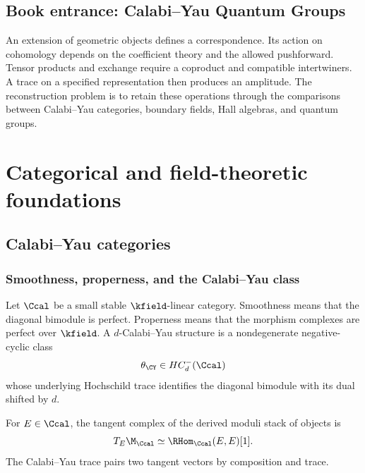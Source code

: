 \cleardoublepage
{}
{}
\chapter*{Book entrance: Calabi--Yau Quantum Groups}
\begin{summarybox}
An extension of geometric objects defines a correspondence. Its action on cohomology depends on the coefficient theory and the allowed pushforward. Tensor products and exchange require a coproduct and compatible intertwiners. A trace on a specified representation then produces an amplitude. The reconstruction problem is to retain these operations through the comparisons between Calabi--Yau categories, boundary fields, Hall algebras, and quantum groups.
\end{summarybox}
\part{Categorical and field-theoretic foundations}

\chapter{Calabi--Yau categories}
\section{Smoothness, properness, and the Calabi--Yau class}
Let $\Ccal$ be a small stable $\kfield$-linear category. Smoothness means that the diagonal bimodule is perfect. Properness means that the morphism complexes are perfect over $\kfield$. A $d$-Calabi--Yau structure is a nondegenerate negative-cyclic class
\[
 \theta_{\CY}\in HC^-_d(\Ccal)
\]
whose underlying Hochschild trace identifies the diagonal bimodule with its dual shifted by $d$.

For $E\in\Ccal$, the tangent complex of the derived moduli stack of objects is
\[
 T_E\M_{\Ccal}\simeq\RHom_{\Ccal}(E,E)[1].
\]
The Calabi--Yau trace pairs two tangent vectors by composition and trace.

